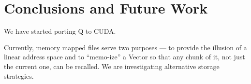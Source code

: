 \section{Conclusions and Future Work}
\label{end}

We have started porting Q to CUDA. \TBC

Currently, memory mapped files serve two purposes --- to provide the illusion of
a linear address space and to ``memo-ize'' a Vector so that any chunk of it, not
just the current one, can be recalled. We are investigating 
alternative storage strategies.
